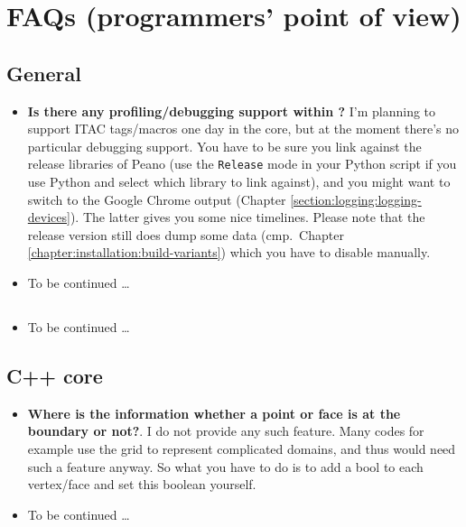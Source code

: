 \chapter{FAQs (programmers' point of view)}



\section{General}


\begin{itemize}
  \item \textbf{Is there any profiling/debugging support within \Peano?} I'm
  planning to support ITAC tags/macros one day in the core, but at the moment
  there's no particular debugging support. You have to be sure you link against
  the release libraries of Peano (use the \texttt{Release} mode in your Python
  script if you use Python and select which library to link against), and you
  might want to switch to the
  Google Chrome output (Chapter \ref{section:logging:logging-devices}). The
  latter gives you some nice timelines. Please note that the release version
  still does dump some data (cmp.~Chapter
  \ref{chapter:installation:build-variants}) which you have to disable manually.
  \item To be continued \dots
\end{itemize}



\section{\ExaHyPE}


\begin{itemize}
  \item To be continued \dots
\end{itemize}



\section{C++ core}

\begin{itemize}
  \item \textbf{Where is the information whether a point or face is at the
  boundary or not?}.
  I do not provide any such feature. Many codes for example use the grid to
  represent complicated domains, and thus would need such a feature anyway. So
  what you have to do is to add a bool to each vertex/face and set this boolean
  yourself.
  \item To be continued \dots
\end{itemize}


